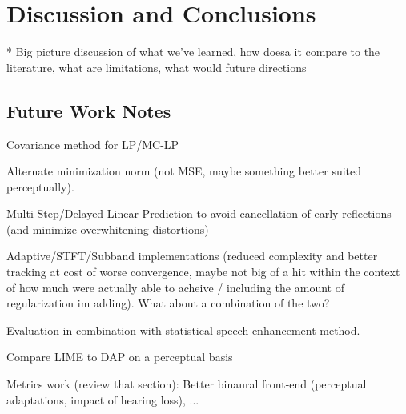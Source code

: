 \chapter{Discussion and Conclusions}

* Big picture discussion of what we've learned, how doesa it compare to the literature, what are limitations, what would future directions

\section{Future Work Notes}

Covariance method for LP/MC-LP

Alternate minimization norm (not MSE, maybe something better suited perceptually).

Multi-Step/Delayed Linear Prediction to avoid cancellation of early reflections (and minimize overwhitening distortions)

Adaptive/STFT/Subband implementations (reduced complexity and better tracking at cost of worse convergence, maybe not big of a hit within the context of how much were actually able to acheive / including the amount of regularization im adding). What about a combination of the two?

Evaluation in combination with statistical speech enhancement method.

Compare LIME to DAP on a perceptual basis

Metrics work (review that section): Better binaural front-end (perceptual adaptations, impact of hearing loss), ...


